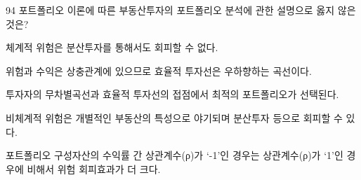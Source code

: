 \begin{question}{94}
포트폴리오 이론에 따른 부동산투자의 포트폴리오 분석에 관한 설명으로 옳지 않은 것은?
\begin{choices}
  \item 체계적 위험은 분산투자를 통해서도 회피할 수 없다.
  \item 위험과 수익은 상충관계에 있으므로 효율적 투자선은 우하향하는 곡선이다.
  \item 투자자의 무차별곡선과 효율적 투자선의 접점에서 최적의 포트폴리오가 선택된다.
  \item 비체계적 위험은 개별적인 부동산의 특성으로 야기되며 분산투자 등으로 회피할 수 있다.
  \item 포트폴리오 구성자산의 수익률 간 상관계수(ρ)가 ‘-1’인 경우는 상관계수(ρ)가 ‘1’인 경우에 비해서 위험 회피효과가 더 크다.
\end{choices}
\end{question}
